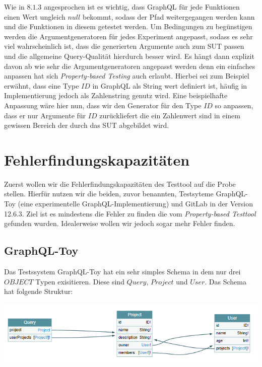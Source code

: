 Wie in $8.1.3$ angesprochen ist es wichtig, dass GraphQL für jede Funktionen einen Wert ungleich $null$ bekommt, sodass der
Pfad weitergegangen werden kann und die Funktionen in diesem getestet werden.
Um Bedingungen zu begünstigen werden die Argumentgeneratoren für jedes Experiment angepasst, sodass es sehr viel wahrscheinlich ist, dass
die generierten Argumente auch zum SUT passen und die allgemeine Query-Qualität hierdurch besser wird.
Es hängt dann explizit davon ab wie sehr die Argumentgeneratoren angepasst werden denn ein einfaches anpassen hat sich \textit{Property-based Testing}\cite{property-based-testing}
auch erlaubt.
Hierbei sei zum Beispiel erwähnt, dass eine Type $ID$ in GraphQL als String wert definiert ist, häufig in Implementierung jedoch als Zahlenstring genutz wird.
Eine beispielhafte Anpassung wäre hier nun, dass wir den Generator für den Type $ID$ so anpassen, dass er nur Argumente für  $ID$ zurückliefert die ein Zahlenwert sind
in einem gewissen Bereich der durch das SUT abgebildet wird.


\section{Fehlerfindungskapazitäten}

Zuerst wollen wir die Fehlerfindungskapazitäten des Testtool auf die Probe stellen.
Hierfür nutzen wir die beiden, zuvor benannten, Testsyteme GraphQL-Toy (eine experimentelle GraphQL-Implementierung) und GitLab in der Version 12.6.3.
Ziel ist es mindestens die Fehler zu finden die vom \textit{Property-based Testtool}\cite{property-based-testing} gefunden wurden.
Idealerweise wollen wir jedoch sogar mehr Fehler finden.

\subsection{GraphQL-Toy}

Das Testssystem GraphQL-Toy hat ein sehr simples Schema in dem nur drei $OBJECT$ Typen exisitieren.
Diese sind $Query$, $Project$ und $User$.
Das Schema hat folgende Struktur: \\
\begin{center}
    \includegraphics[width=\textwidth,height=\textheight,keepaspectratio]{img/graphqltoy}
\end{center}

